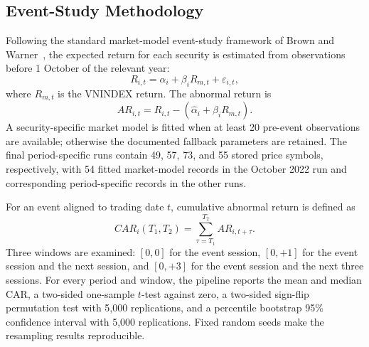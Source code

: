 \documentclass[12pt,a4paper]{article}
\begin{document}
\subsection{Event-Study Methodology}
\label{subsec:event-study-multi-year}

Following the standard market-model event-study framework of Brown and Warner~\cite{brownwarner1985}, the expected return for each security is estimated from observations before 1 October of the relevant year:
\begin{equation}
 R_{i,t}=\alpha_i+\beta_iR_{m,t}+\varepsilon_{i,t},
\end{equation}
where $R_{m,t}$ is the VNINDEX return. The abnormal return is
\begin{equation}
 AR_{i,t}=R_{i,t}-\left(\widehat{\alpha}_i+\widehat{\beta}_iR_{m,t}\right).
\end{equation}
A security-specific market model is fitted when at least 20 pre-event observations are available; otherwise the documented fallback parameters are retained. The final period-specific runs contain 49, 57, 73, and 55 stored price symbols, respectively, with 54 fitted market-model records in the October 2022 run and corresponding period-specific records in the other runs.

For an event aligned to trading date $t$, cumulative abnormal return is defined as
\begin{equation}
 CAR_i(T_1,T_2)=\sum_{\tau=T_1}^{T_2}AR_{i,t+\tau}.
\end{equation}
Three windows are examined: $[0,0]$ for the event session, $[0,+1]$ for the event session and the next session, and $[0,+3]$ for the event session and the next three sessions. For every period and window, the pipeline reports the mean and median CAR, a two-sided one-sample $t$-test against zero, a two-sided sign-flip permutation test with 5,000 replications, and a percentile bootstrap 95\% confidence interval with 5,000 replications. Fixed random seeds make the resampling results reproducible.
\end{document}
